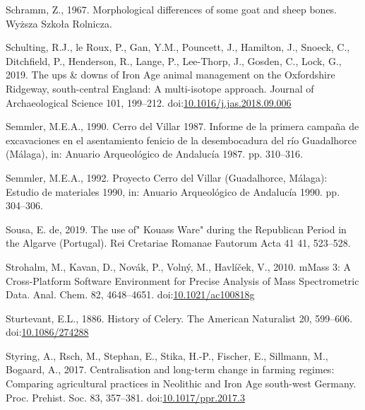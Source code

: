 \documentclass[review]{elsarticle} %
\newlength{\cslhangindent}
\newenvironment{CSLReferences}[2] %
 {%
  \setlength{\parindent}{0pt}
  \ifodd #1 \everypar{\setlength{\hangindent}{\cslhangindent}}\ignorespaces\fi
  \ifnum #2 > 0
  \setlength{\parskip}{#2\baselineskip}
  \fi
 }%
 {}
\begin{document}
\begin{CSLReferences}{1}{0}
\leavevmode{}%
Schramm, Z., 1967. Morphological differences of some goat and sheep bones. {Wyższa Szkoła Rolnicza}.

\leavevmode{}%
Schulting, R.J., le Roux, P., Gan, Y.M., Pouncett, J., Hamilton, J., Snoeck, C., Ditchfield, P., Henderson, R., Lange, P., Lee-Thorp, J., Gosden, C., Lock, G., 2019. The ups \& downs of {Iron Age} animal management on the {Oxfordshire Ridgeway}, south-central {England}: A multi-isotope approach. Journal of Archaeological Science 101, 199--212. doi:\href{https://doi.org/10.1016/j.jas.2018.09.006}{10.1016/j.jas.2018.09.006}

\leavevmode{}%
Semmler, M.E.A., 1990. Cerro del {Villar} 1987. {Informe} de la primera campaña de excavaciones en el asentamiento fenicio de la desembocadura del río {Guadalhorce} ({Málaga}), in: Anuario Arqueológico de {Andalucía} 1987. pp. 310--316.

\leavevmode{}%
Semmler, M.E.A., 1992. Proyecto {Cerro} del {Villar} ({Guadalhorce}, {Málaga}): Estudio de materiales 1990, in: Anuario Arqueológico de {Andalucía} 1990. pp. 304--306.

\leavevmode{}%
Sousa, E. de, 2019. The use of" {Kouass Ware}" during the {Republican Period} in the {Algarve} ({Portugal}). Rei Cretariae Romanae Fautorum Acta 41 41, 523--528.

\leavevmode{}%
Strohalm, M., Kavan, D., Novák, P., Volný, M., Havlíček, V., 2010. {mMass} 3: A {Cross}-{Platform Software Environment} for {Precise Analysis} of {Mass Spectrometric Data}. Anal. Chem. 82, 4648--4651. doi:\href{https://doi.org/10.1021/ac100818g}{10.1021/ac100818g}

\leavevmode{}%
Sturtevant, E.L., 1886. History of {Celery}. The American Naturalist 20, 599--606. doi:\href{https://doi.org/10.1086/274288}{10.1086/274288}

\leavevmode{}%
Styring, A., Rsch, M., Stephan, E., Stika, H.-P., Fischer, E., Sillmann, M., Bogaard, A., 2017. Centralisation and long-term change in farming regimes: Comparing agricultural practices in {Neolithic} and {Iron Age} south-west {Germany}. Proc. Prehist. Soc. 83, 357--381. doi:\href{https://doi.org/10.1017/ppr.2017.3}{10.1017/ppr.2017.3}


\end{CSLReferences}
\end{document}
